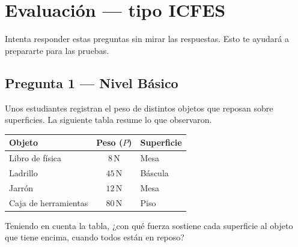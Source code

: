 \documentclass[
  spanish,
  letterpaper,
  12pt,
  oneside,
  open=any,
  DIV=15]{scrbook}
\newcounter{none} %
\newcommand{\setcolorsection}[2]{%
  \definecolor{currentsectionbg}{HTML}{#1}%
  \definecolor{currentsectionborder}{HTML}{#2}%
}
\begin{document}
\setcolorsection{f0c4b8}{dcb0a4}

\section{Evaluación --- tipo ICFES}\label{evaluaciuxf3n-tipo-icfes-4}

Intenta responder estas preguntas sin mirar las respuestas. Esto te
ayudará a prepararte para las pruebas.

\subsection{Pregunta 1 --- Nivel
Básico}\label{pregunta-1-nivel-buxe1sico-4}

Unos estudiantes registran el peso de distintos objetos que reposan
sobre superficies. La siguiente tabla resume lo que observaron.

{\def\LTcaptype{none} %
\begin{longtable}[]{@{}lcl@{}}
\toprule\noalign{}
Objeto & Peso (\(P\)) & Superficie \\
\midrule\noalign{}
\endhead
\bottomrule\noalign{}
\endlastfoot
Libro de física & \(8\,\text{N}\) & Mesa \\
Ladrillo & \(45\,\text{N}\) & Báscula \\
Jarrón & \(12\,\text{N}\) & Mesa \\
Caja de herramientas & \(80\,\text{N}\) & Piso \\
\end{longtable}
}

Teniendo en cuenta la tabla, ¿con qué fuerza sostiene cada superficie al
objeto que tiene encima, cuando todos están en reposo?
\end{document}
